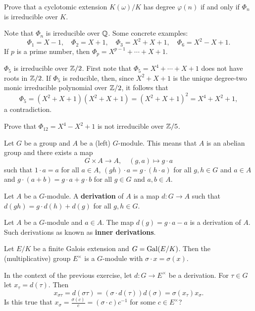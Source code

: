 \begin{exercise}
    Prove that a cyclotomic extension $K(\omega)/K$ has degree $\varphi(n)$ if and only if 
    $\Phi_n$ is irreducible over $K$. 
\end{exercise}

Note that $\Phi_n$ is irreducible over $\mathbb{Q}$. Some concrete examples:
\[
\Phi_1=X-1,
\quad
\Phi_2=X+1,
\quad
\Phi_3=X^2+X+1,
\quad
\Phi_6=X^2-X+1.
\]
If $p$ is a prime number, then $\Phi_p=X^{p-1}+\cdots+X+1$. 

\begin{example}
    $\Phi_5$ is irreducible over $\mathbb{Z}/2$. First note that
    $\Phi_5=X^{4}+\cdots+X+1$ does not have roots in $\mathbb{Z}/2$. If 
    $\Phi_5$ is reducible, then, since
    $X^2+X+1$ is the unique degree-two 
    monic irreducible polynomial 
    over $\mathbb{Z}/2$, it follows that
    \[
    \Phi_5=(X^2+X+1)(X^2+X+1)=(X^2+X+1)^2=X^4+X^2+1,
    \]
    a contradiction.
\end{example}

\begin{exercise}
Prove that
$\Phi_{12}=X^4-X^2+1$ is not irreducible over $\mathbb{Z}/5$. 
\end{exercise}


Let $G$ be a group and $A$ be a (left) $G$-module. This means that $A$ is an abelian
group and there exists a map
\[
G\times A\to A,\quad
(g,a)\mapsto g\cdot a
\]
such that $1\cdot a=a$ for all $a\in A$, $(gh)\cdot a=g\cdot (h\cdot a)$ for 
all $g,h\in G$ and $a\in A$ and $g\cdot (a+b)=g\cdot a+g\cdot b$ for
all $g\in G$ and $a,b\in A$. 

\begin{definition}
    Let $A$ be a $G$-module. 
    A \textbf{derivation} of $A$ is a map $d\colon G\to A$ such that
    $d(gh)=g\cdot d(h)+d(g)$ for all $g,h\in G$. 
\end{definition}

Let $A$ be a $G$-module and $a\in A$. The map 
$d(g)=g\cdot a-a$ is a derivation of $A$. 
Such derivations as known as \textbf{inner derivations}. 

\begin{exercise}
    Let $E/K$ be a finite Galois extension and $G=\operatorname{Gal}(E/K)$. 
    Then the (multiplicative) group $E^\times$ is a $G$-module with
    $\sigma\cdot x=\sigma(x)$. 
\end{exercise}

In the context of the previous exercise, 
let $d\colon G\to E^\times$ be a derivation. For $\tau\in G$ let 
$x_\tau=d(\tau)$. Then
\[
x_{\sigma\tau}=d(\sigma\tau)=(\sigma\cdot d(\tau))d(\sigma)=\sigma(x_\tau)x_\sigma.
\]
Is this true that $x_\sigma=\frac{\sigma(c)}{c}=(\sigma\cdot c)c^{-1}$ 
for some $c\in E^\times$?

